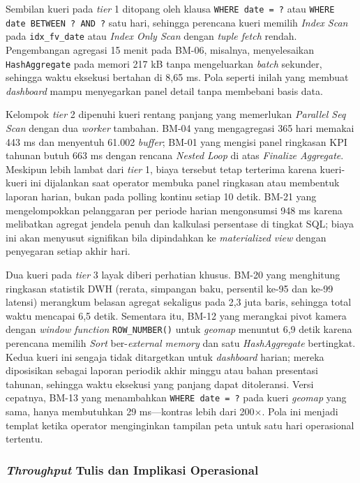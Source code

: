 Sembilan kueri pada \textit{tier} 1 ditopang oleh klausa \texttt{WHERE date = ?} atau \texttt{WHERE date BETWEEN ? AND ?} satu hari, sehingga perencana kueri memilih \textit{Index Scan} pada \texttt{idx\_fv\_date} atau \textit{Index Only Scan} dengan \textit{tuple fetch} rendah. Pengembangan agregasi 15 menit pada BM-06, misalnya, menyelesaikan \texttt{HashAggregate} pada memori 217 kB tanpa mengeluarkan \textit{batch} sekunder, sehingga waktu eksekusi bertahan di 8,65 ms. Pola seperti inilah yang membuat \textit{dashboard} mampu menyegarkan panel detail tanpa membebani basis data.

Kelompok \textit{tier} 2 dipenuhi kueri rentang panjang yang memerlukan \textit{Parallel Seq Scan} dengan dua \textit{worker} tambahan. BM-04 yang mengagregasi 365 hari memakai 443 ms dan menyentuh 61.002 \textit{buffer}; BM-01 yang mengisi panel ringkasan KPI tahunan butuh 663 ms dengan rencana \textit{Nested Loop} di atas \textit{Finalize Aggregate}. Meskipun lebih lambat dari \textit{tier} 1, biaya tersebut tetap terterima karena kueri-kueri ini dijalankan saat operator membuka panel ringkasan atau membentuk laporan harian, bukan pada polling kontinu setiap 10 detik. BM-21 yang mengelompokkan pelanggaran per periode harian mengonsumsi 948 ms karena melibatkan agregat jendela penuh dan kalkulasi persentase di tingkat SQL; biaya ini akan menyusut signifikan bila dipindahkan ke \textit{materialized view} dengan penyegaran setiap akhir hari.

Dua kueri pada \textit{tier} 3 layak diberi perhatian khusus. BM-20 yang menghitung ringkasan statistik DWH (rerata, simpangan baku, persentil ke-95 dan ke-99 latensi) merangkum belasan agregat sekaligus pada 2,3 juta baris, sehingga total waktu mencapai 6,5 detik. Sementara itu, BM-12 yang merangkai pivot kamera dengan \textit{window function} \texttt{ROW\_NUMBER()} untuk \textit{geomap} menuntut 6,9 detik karena perencana memilih \textit{Sort} ber-\textit{external memory} dan satu \textit{HashAggregate} bertingkat. Kedua kueri ini sengaja tidak ditargetkan untuk \textit{dashboard} harian; mereka diposisikan sebagai laporan periodik akhir minggu atau bahan presentasi tahunan, sehingga waktu eksekusi yang panjang dapat ditoleransi. Versi cepatnya, BM-13 yang menambahkan \texttt{WHERE date = ?} pada kueri \textit{geomap} yang sama, hanya membutuhkan 29 ms---kontras lebih dari 200$\times$. Pola ini menjadi templat ketika operator menginginkan tampilan peta untuk satu hari operasional tertentu.

\subsubsection{\textit{Throughput} Tulis dan Implikasi Operasional}
\label{subsubsec:throughput-tulis}

